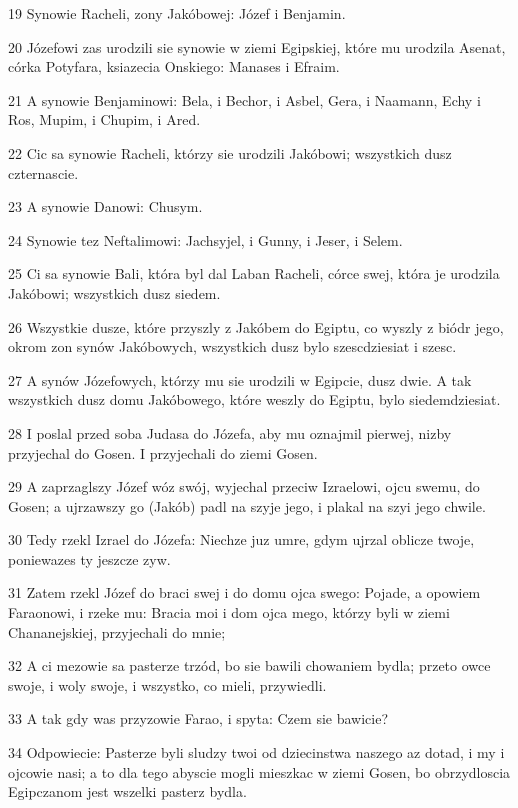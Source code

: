 \par 19 Synowie Racheli, zony Jakóbowej: Józef i Benjamin.
\par 20 Józefowi zas urodzili sie synowie w ziemi Egipskiej, które mu urodzila Asenat, córka Potyfara, ksiazecia Onskiego: Manases i Efraim.
\par 21 A synowie Benjaminowi: Bela, i Bechor, i Asbel, Gera, i Naamann, Echy i Ros, Mupim, i Chupim, i Ared.
\par 22 Cic sa synowie Racheli, którzy sie urodzili Jakóbowi; wszystkich dusz czternascie.
\par 23 A synowie Danowi: Chusym.
\par 24 Synowie tez Neftalimowi: Jachsyjel, i Gunny, i Jeser, i Selem.
\par 25 Ci sa synowie Bali, która byl dal Laban Racheli, córce swej, która je urodzila Jakóbowi; wszystkich dusz siedem.
\par 26 Wszystkie dusze, które przyszly z Jakóbem do Egiptu, co wyszly z biódr jego, okrom zon synów Jakóbowych, wszystkich dusz bylo szescdziesiat i szesc.
\par 27 A synów Józefowych, którzy mu sie urodzili w Egipcie, dusz dwie. A tak wszystkich dusz domu Jakóbowego, które weszly do Egiptu, bylo siedemdziesiat.
\par 28 I poslal przed soba Judasa do Józefa, aby mu oznajmil pierwej, nizby przyjechal do Gosen. I przyjechali do ziemi Gosen.
\par 29 A zaprzaglszy Józef wóz swój, wyjechal przeciw Izraelowi, ojcu swemu, do Gosen; a ujrzawszy go (Jakób) padl na szyje jego, i plakal na szyi jego chwile.
\par 30 Tedy rzekl Izrael do Józefa: Niechze juz umre, gdym ujrzal oblicze twoje, poniewazes ty jeszcze zyw.
\par 31 Zatem rzekl Józef do braci swej i do domu ojca swego: Pojade, a opowiem Faraonowi, i rzeke mu: Bracia moi i dom ojca mego, którzy byli w ziemi Chananejskiej, przyjechali do mnie;
\par 32 A ci mezowie sa pasterze trzód, bo sie bawili chowaniem bydla; przeto owce swoje, i woly swoje, i wszystko, co mieli, przywiedli.
\par 33 A tak gdy was przyzowie Farao, i spyta: Czem sie bawicie?
\par 34 Odpowiecie: Pasterze byli sludzy twoi od dziecinstwa naszego az dotad, i my i ojcowie nasi; a to dla tego abyscie mogli mieszkac w ziemi Gosen, bo obrzydloscia Egipczanom jest wszelki pasterz bydla.

